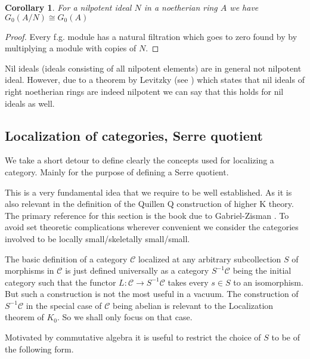 \documentclass[12pt]{article}
\numberwithin{equation}{section}
\newcounter{dummy} \numberwithin{dummy}{section}
\newtheorem{corollary}[dummy]{Corollary}
\begin{document}
	\begin{corollary}
		For a nilpotent ideal $N$ in a noetherian ring $A$ we have $G_0(A/N) \cong G_0(A	)$
	\end{corollary}
	\begin{proof}
		Every f.g. module has a natural filtration which goes to zero found by by multiplying a module with copies of $N$.
	\end{proof}	
	Nil ideals (ideals consisting of all nilpotent elements) are in general not nilpotent ideal. However, due to a theorem by Levitzky (see \cite[Th. 10.30]{lam2001first}) which states that nil ideals of right noetherian rings are indeed nilpotent we can say that this holds for nil ideals as well.
	\subsection{Localization of categories, Serre quotient}
		We take a short detour to define clearly the concepts used for localizing a category. Mainly for the purpose of defining a Serre quotient. 
		
		This is a very fundamental idea that we require to be well established. As it is also relevant in the definition of the Quillen Q construction of higher K theory. The primary reference for this section is the book due to Gabriel-Zisman \cite{gabriel1967calculus}. To avoid set theoretic complications wherever convenient we consider the categories involved to be locally small/skeletally small/small.
		
		The basic definition of a category $\mathcal{C}$ localized at any arbitrary subcollection $S$ of morphisms in $\mathcal{C}$ is just defined universally as a category $S^{-1}\mathcal{C}$ being the initial category such that the functor $L: \mathcal{C} \to S^{-1}\mathcal{C}$ takes every $s \in S$ to an isomorphism. But such a construction is not the most useful in a vacuum. The construction of $S^{-1}\mathcal{C}$ in the special case of $\mathcal{C}$ being abelian is relevant to the Localization theorem of $K_0$. So we shall only focus on that case.
		
		Motivated by commutative algebra it is useful to restrict the choice of $S$ to be of the following form.
		
\end{document}
